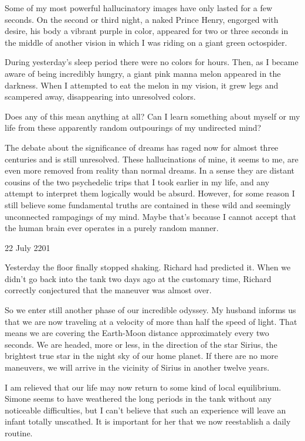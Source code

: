 \documentclass[]{article}
\begin{document}
Some of my most powerful hallucinatory images have only lasted for a few seconds.  On the second or third night, a naked Prince Henry, engorged with desire, his body a vibrant purple in color, appeared for two or three seconds in the middle of another vision in which I was riding on a giant green octospider.

During yesterday’s sleep period there were no colors for hours.  Then, as I became aware of being incredibly hungry, a giant pink manna melon appeared in the darkness.  When I attempted to eat the melon in my vision, it grew legs and scampered away, disappearing into unresolved colors.

Does any of this mean anything at all? Can I learn something about myself or my life from these apparently random outpourings of my undirected mind?

The debate about the significance of dreams has raged now for almost three centuries and is still unresolved.  These hallucinations of mine, it seems to me, are even more removed from reality than normal dreams.  In a sense they are distant cousins of the two psychedelic trips that I took earlier in my life, and any attempt to interpret them logically would be absurd.  However, for some reason I still believe some fundamental truths are contained in these wild and seemingly unconnected rampagings of my mind.  Maybe that’s because I cannot accept that the human brain ever operates in a purely random manner.

22 July 2201

Yesterday the floor finally stopped shaking.  Richard had predicted it.  When we didn’t go back into the tank two days ago at the customary time, Richard correctly conjectured that the maneuver was almost over.

So we enter still another phase of our incredible odyssey.  My husband informs us that we are now traveling at a velocity of more than half the speed of light.  That means we are covering the Earth-Moon distance approximately every two seconds.  We are headed, more or less, in the direction of the star Sirius, the brightest true star in the night sky of our home planet.  If there are no more maneuvers, we will arrive in the vicinity of Sirius in another twelve years.

I am relieved that our life may now return to some kind of local equilibrium.  Simone seems to have weathered the long periods in the tank without any noticeable difficulties, but I can’t believe that such an experience will leave an infant totally unscathed.  It is important for her that we now reestablish a daily routine.
\end{document}
